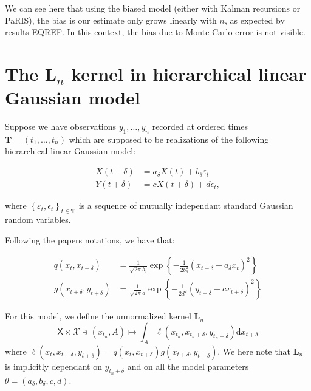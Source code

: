 \documentclass[]{article}
\begin{document}
We can see here that using the biased model (either with Kalman
recursions or PaRIS), the bias is our estimate only grows linearly with
\(n\), as expected by results EQREF. In this context, the bias due to
Monte Carlo error is not visible.

\hypertarget{the-mathbfl_n-kernel-in-hierarchical-linear-gaussian-model}{%
\section{\texorpdfstring{The \(\mathbf{L}_n\) kernel in hierarchical
linear Gaussian
model}{The \textbackslash{}mathbf\{L\}\_n kernel in hierarchical linear Gaussian model}}\label{the-mathbfl_n-kernel-in-hierarchical-linear-gaussian-model}}

Suppose we have observations \(y_1,\dots, y_n\) recorded at ordered
times \(\mathbf{T} = (t_1,\dots, t_n)\) which are supposed to be
realizations of the following hierarchical linear Gaussian model:

\begin{align}
X(t + \delta) &= a_\delta X(t) + b_\delta \varepsilon_t \\
Y(t + \delta) &= c X(t + \delta) + d \epsilon_t,
\end{align}

where
\(\left\lbrace \varepsilon_t, \epsilon_t \right\rbrace_{t\in \mathbf{T}}\)
is a sequence of mutually independant standard Gaussian random
variables.

Following the papers notations, we have that:

\begin{align*}
q(x_t, x_{t + \delta}) &=\frac{1}{\sqrt{2\pi}b_\delta}\exp\left\lbrace-\frac{1}{2b^2_\delta} \left( x_{t+\delta} - a_\delta x_t \right)^2 \right\rbrace\\
g(x_{t + \delta}, y_{t + \delta}) &= \frac{1}{\sqrt{2\pi}d} \exp\left\lbrace -\frac{1}{2d^2} \left( y_{t+\delta} - c x_{t + \delta} \right)^2\right\rbrace
\end{align*}

For this model, we define the unnormalized kernel \(\mathbf{L}_n\)
\[\mathsf{X} \times \mathcal{X} \owns (x_{t_n}, A) \mapsto \int_A \ell(x_{t_n}, x_{t_n + \delta}, y_{t_n + \delta}) \text{d} x_{t + \delta}\]
where
\(\ell(x_t, x_{t + \delta}, y_{t + \delta}) = q(x_t, x_{t + \delta})g(x_{t + \delta}, y_{t + \delta})\).
We here note that \(\mathbf{L}_n\) is implicitly dependant on
\(y_{t_n + \delta}\) and on all the model parameters
\(\theta = \left(a_\delta, b_\delta, c, d \right)\).
\end{document}
